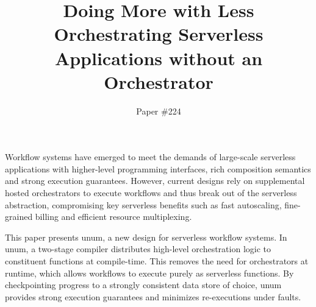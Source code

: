 \documentclass[letterpaper,twocolumn,10pt]{article}
\newcommand{\name}{unum}
\begin{document}

\date{}

\title{Doing More with Less \\ Orchestrating Serverless Applications
without an Orchestrator}

\author{
  Paper \#224
} %

\maketitle
\thispagestyle{empty}

\abstract

Workflow systems have emerged to meet the demands of large-scale serverless
applications with higher-level programming interfaces, rich composition
semantics and strong execution guarantees. However, current designs rely on
supplemental hosted orchestrators to execute workflows and thus break out of
the serverless abstraction, compromising key serverless benefits such as fast
autoscaling, fine-grained billing and efficient resource multiplexing. 

This paper presents \name{}, a new design for serverless workflow systems. 
In \name{}, a two-stage compiler distributes high-level orchestration
logic to constituent functions at compile-time. 
This removes the need for orchestrators at runtime, which allows workflows to 
execute purely as serverless functions. 
By checkpointing progress to a strongly consistent data store 
of choice, \name{} provides strong execution guarantees 
and minimizes re-executions under faults. 
\end{document}

